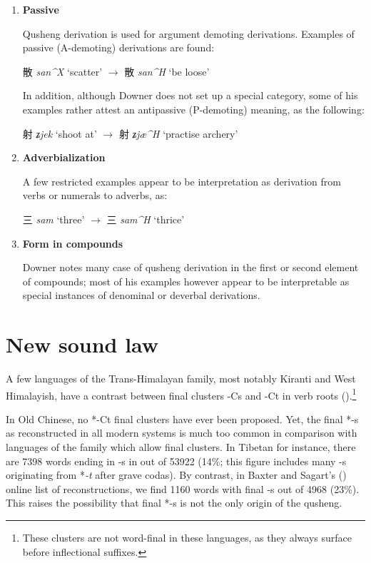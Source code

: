 \documentclass[oneside,a4paper,11pt]{article}
\newcommand{\ipa}[1]{{\phon\textit{\mbox{#1}}}}
\newcommand{\zh}[1]{{\cn#1}}
\newcommand{\ch}[3]{\zh{#1} \ipa{#2} `#3'}
\begin{document}
\begin{enumerate}
\item \textbf{Passive}

Qusheng derivation is used for argument demoting derivations. Examples of passive (A-demoting) derivations are found:

\ch{散}{san^X}{scatter} $\rightarrow$ \ch{散}{san^H}{be loose} 

In addition, although Downer does not set up a special category, some of his examples rather attest an antipassive (P-demoting) meaning, as the following:

\ch{射}{ʑjek}{shoot at} $\rightarrow$ \ch{射}{ʑjæ^H}{practise archery} 

\item \textbf{Adverbialization}

A few restricted examples appear to be interpretation as derivation from verbs or numerals to adverbs, as:

\ch{三}{sam}{three} $\rightarrow$ \ch{三}{sam^H}{thrice} 

\item \textbf{Form in compounds}

Downer notes many case of qusheng derivation in the first or second element of compounds; most of his examples however appear to be interpretable as special instances of denominal or deverbal derivations.

\end{enumerate}

\section{New sound law}
A few languages of the Trans-Himalayan family, most notably Kiranti and West Himalayish, have a contrast between final clusters -Cs and -Ct in verb roots (\citealt{michailovsky85dental}).\footnote{These clusters are not word-final in these languages, as they always surface before inflectional suffixes.} 

In Old Chinese, no *-Ct final clusters have ever been proposed. Yet, the final *-s as reconstructed in all modern systems is much too common in comparison with languages of the family which allow final clusters. In Tibetan for instance, there are 7398 words ending in -s in  \citet{bodrgya} out of 53922 (14\%; this figure includes many -s originating from *\ipa{-t} after grave codas). By contrast, in Baxter and Sagart's (\citeyear{bs14oc}) online list of reconstructions, we find 1160 words with final -s out of 4968 (23\%). This raises the possibility that final *-s is not the only origin of the qusheng.
\end{document}
